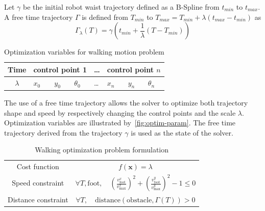 \documentclass[conference,final,a4paper,twocolumn,9pt]{IEEEtran}
\begin{document}
Let $\gamma$ be the initial robot waist trajectory defined as a
B-Spline from $t_{min}$ to $t_{max}$. A free time trajectory $\Gamma$
is defined from $T_{min}$ to \linebreak $T_{max} = T_{min} + \lambda
(t_{max} - t_{min})$ as
\begin{equation}
  \Gamma_{\lambda} (T) = \gamma (t_{min} + \frac{1}{\lambda} (T -
  T_{min}))
\end{equation}

\begin{table}[ht!]
  \begin{center}
    \begin{tabular}{|c|l l l| l |l l l|}
      \hline
      Time
      & \multicolumn{3}{|c|}{control point 1}
      & \ldots
      & \multicolumn{3}{|c|}{control point $n$}\\
      \hline
      $\lambda$
      & $x_0$ & $y_0$ & $\theta_0$
      & \ldots
      & $x_n$ & $y_n$ & $\theta_n$\\
      \hline
    \end{tabular}
  \end{center}
  \caption{Optimization variables for walking motion problem\label{fig:optim-param}}
\end{table}


The use of a free time trajectory allows the solver to optimize both
trajectory shape and speed by respectively changing the control points
and the scale $\lambda$. Optimization variables are illustrated
by~\autoref{fig:optim-param}. The free time trajectory derived from
the trajectory $\gamma$ is used as the state of the solver.


\begin{table}[ht!]
  \begin{center}
    \begin{tabular}{|c|c|}
      \hline Cost function & $f(\mathbf{x}) = \lambda$\\ Speed
      constraint & $\forall T, \text{foot},\quad
      (\frac{v_{\text{foot}}^{x}}{v_{\text{max}}^{x}})^2 +
      (\frac{v_{\text{foot}}^{y}}{v_{\text{max}}^{y}})^2 - 1 \leq
      0$\\ Distance constraint & $\forall T,\quad\text{distance} (\text{obstacle},
      \Gamma (T)) > 0$\\ \hline
    \end{tabular}
    \caption{Walking optimization problem formulation\label{fig:pb-walking}}
  \end{center}
\end{table}
\end{document}
